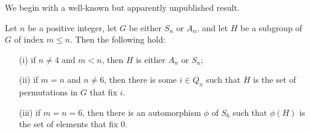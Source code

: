 \documentclass{llncs}
\begin{document}
We begin with a well-known but apparently unpublished result.
\begin{lemma}
Let $n$ be a positive integer, let $G$ be either $S_n$ or $A_n$, and let $H$ be a subgroup of $G$ of index $m\le n$.  Then the following hold:
\begin{enumerate}
\item[(i)] if $n\neq 4$ and $m<n$, then $H$ is either $A_n$ or $S_n$;
\item[(ii)] if $m=n$ and $n\neq 6$, then there is some $i\in Q_n$ such that $H$ is the set of permutations in $G$ that fix $i$.
\item[(iii)] if $m=n=6$, then there is an automorphism $\phi$ of $S_6$ such that $\phi(H)$ is the set of elements that fix $0$.\end{enumerate}
\label{lem: bertrand}
\end{lemma}
\end{document}

